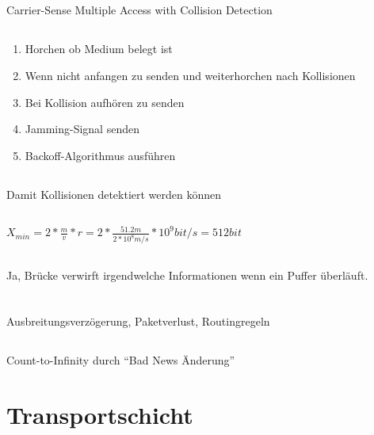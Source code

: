 \documentclass[a4paper]{article}
\begin{document}
\subsection{}
Carrier-Sense Multiple Access with Collision Detection
\subsection{}
\begin{enumerate}
\item Horchen ob Medium belegt ist
\item Wenn nicht anfangen zu senden und weiterhorchen nach Kollisionen
\item Bei Kollision aufhören zu senden
\item Jamming-Signal senden
\item Backoff-Algorithmus ausführen
\end{enumerate}
\subsection{}
Damit Kollisionen detektiert werden können
\subsection{}
$X_{min} = 2 * \frac{m}{v} * r = 2 * \frac{51.2m}{2*10^8 m/s} * 10^9 bit/s = 512 bit$
\subsection{}
Ja, Brücke verwirft irgendwelche Informationen wenn ein Puffer überläuft.
\pagebreak
\section{}
\subsection{}
Ausbreitungsverzögerung, Paketverlust, Routingregeln
\subsection{}
\subsection{}
Count-to-Infinity durch ``Bad News Änderung''
\pagebreak
\section{Transportschicht}
\end{document}
